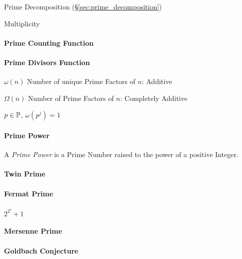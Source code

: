 Prime Decomposition (\S\ref{sec:prime_decomposition})

Multiplicity



\paragraph{Prime Counting Function}\label{sec:prime_counting}\hfill

\paragraph{Prime Divisors Function}\label{sec:prime_divisors}\hfill

$\omega(n)$ Number of unique Prime Factors of $n$: Additive

$\Omega(n)$ Number of Prime Factors of $n$: Completely Additive

$p \in \mathbb{P}$, $\omega(p^j) = 1$



\paragraph{Prime Power}\label{sec:prime_power}\hfill

A \emph{Prime Power} is a Prime Number raised to the power of a
positive Integer.



\paragraph{Twin Prime}\label{sec:twin_prime}\hfill

\paragraph{Fermat Prime}\label{sec:fermat_prime}\hfill

$2^{2^i} + 1$



\paragraph{Mersenne Prime}\label{sec:mersenne_prime}\hfill

\paragraph{Goldbach Conjecture}\label{sec:goldbach_conjecture}\hfill

